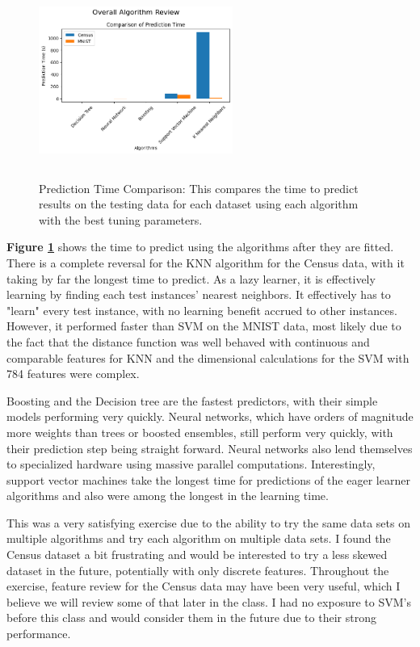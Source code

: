 \documentclass[letterpaper]{article} %
\begin{document}
\begin{figure}[h]
\centering
\includegraphics[width=2.5in, height=2.5in]{figures/Overall_Algorithm_ReviewComparison_of_Prediction_Time_.png}
\caption{Prediction Time Comparison:  This compares the time to predict results on the testing data for each dataset using each algorithm with the best tuning parameters.  }
\label{fig:overall_prediction_time}
\end{figure}
 
\textbf{Figure \ref{fig:overall_prediction_time}} shows the time to predict using the algorithms after they are fitted.  There is a complete reversal for the KNN algorithm for the Census data, with it taking by far the longest time to predict.  As a lazy learner, it is effectively learning by finding each test instances' nearest neighbors.  It effectively has to "learn" every test instance, with no learning benefit accrued to other instances.  However, it performed faster than SVM on the MNIST data, most likely due to the fact that the distance function was well behaved with continuous and comparable features for KNN and the dimensional calculations for the SVM with 784 features were complex.

Boosting and the Decision tree are the fastest predictors, with their simple models performing very quickly.  Neural networks, which have orders of magnitude more weights than trees or boosted ensembles, still perform very quickly, with their prediction step being straight forward.  Neural networks also lend themselves to specialized hardware using massive parallel computations. Interestingly, support vector machines take the longest time for predictions of the eager learner algorithms and also were among the longest in the learning time.  

This was a very satisfying exercise due to the ability to try the same data sets on multiple algorithms and try each algorithm on multiple data sets. I found the Census dataset a bit frustrating and would be interested to try a less skewed dataset in the future, potentially with only discrete features.  Throughout the exercise, feature review for the Census data may have been very useful, which I believe we will review some of that later in the class.  I had no exposure to SVM's before this class and would consider them in the future due to their strong performance.  
\end{document}
